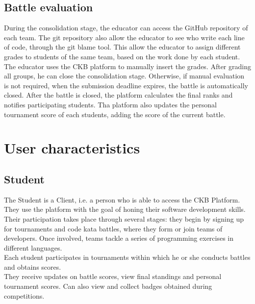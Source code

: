 \subsection{Battle evaluation}
During the consolidation stage, the educator can access the GitHub repository of each team.
The git repository also allow the educator to see who write each line of code, through the git blame tool.
This allow the educator to assign different grades to students of the same team, based on the work done by each student.
The educator uses the CKB platform to manually insert the grades.
After grading all groups, he can close the consolidation stage.
Otherwise, if manual evaluation is not required, when the submission deadline expires,
the battle is automatically closed.
After the battle is closed, the platform calculates the final ranks and notifies participating students.
Tha platform also updates the personal tournament score of each students, adding the score of the current battle.
\begin{adjustbox}{
		max size={\textwidth}{},
		caption={ Battle evaluation activity diagram},
		label={fig:Battle evaluation activity diagram},
		figure=H}
	\centering
\end{adjustbox}


\section{User characteristics}
\subsection{Student}
The Student is a Client, i.e. a person who is able to access the CKB Platform.\\
They use the platform with the goal of honing their software development skills. Their participation takes place through several stages: they begin by signing up for tournaments and code kata battles, where they form or join teams of developers. Once involved, teams tackle a series of programming exercises in different languages. \\
Each student participates in tournaments within which he or she conducts battles and obtains scores.\\
They receive updates on battle scores, view final standings and personal tournament scores. Can also view and collect badges obtained during competitions.


